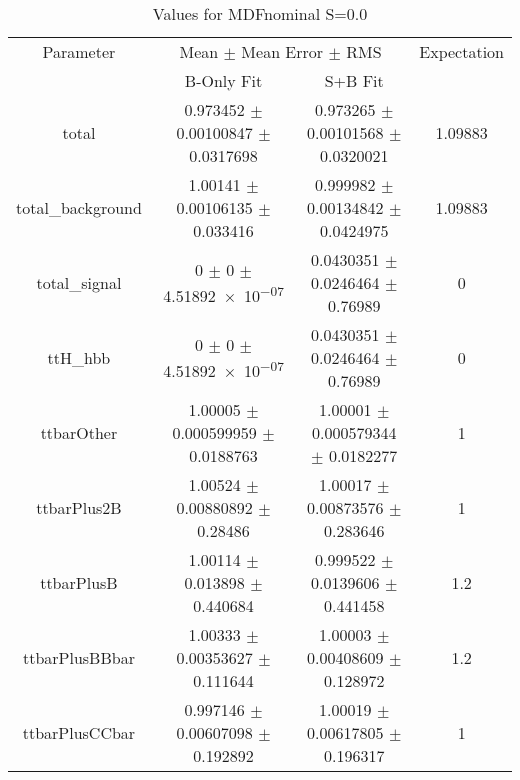 \begin{table}
\centering
\caption{Values for MDFnominal S=0.0}
\begin{tabular}{cccc}
\toprule
Parameter & \multicolumn{2}{c}{Mean $\pm$ Mean Error $\pm$ RMS} & Expectation\\
 & B-Only Fit & S+B Fit & \\
\midrule
total & \num{0.973452} $\pm$ \num{0.00100847} $\pm$ \num{0.0317698} & \num{0.973265} $\pm$ \num{0.00101568} $\pm$ \num{0.0320021} & \num{1.09883}\\
total\_background & \num{1.00141} $\pm$ \num{0.00106135} $\pm$ \num{0.033416} & \num{0.999982} $\pm$ \num{0.00134842} $\pm$ \num{0.0424975} & \num{1.09883}\\
total\_signal & \num{0} $\pm$ \num{0} $\pm$ \num{4.51892e-07} & \num{0.0430351} $\pm$ \num{0.0246464} $\pm$ \num{0.76989} & \num{0}\\
ttH\_hbb & \num{0} $\pm$ \num{0} $\pm$ \num{4.51892e-07} & \num{0.0430351} $\pm$ \num{0.0246464} $\pm$ \num{0.76989} & \num{0}\\
ttbarOther & \num{1.00005} $\pm$ \num{0.000599959} $\pm$ \num{0.0188763} & \num{1.00001} $\pm$ \num{0.000579344} $\pm$ \num{0.0182277} & \num{1}\\
ttbarPlus2B & \num{1.00524} $\pm$ \num{0.00880892} $\pm$ \num{0.28486} & \num{1.00017} $\pm$ \num{0.00873576} $\pm$ \num{0.283646} & \num{1}\\
ttbarPlusB & \num{1.00114} $\pm$ \num{0.013898} $\pm$ \num{0.440684} & \num{0.999522} $\pm$ \num{0.0139606} $\pm$ \num{0.441458} & \num{1.2}\\
ttbarPlusBBbar & \num{1.00333} $\pm$ \num{0.00353627} $\pm$ \num{0.111644} & \num{1.00003} $\pm$ \num{0.00408609} $\pm$ \num{0.128972} & \num{1.2}\\
ttbarPlusCCbar & \num{0.997146} $\pm$ \num{0.00607098} $\pm$ \num{0.192892} & \num{1.00019} $\pm$ \num{0.00617805} $\pm$ \num{0.196317} & \num{1}\\
\bottomrule
\end{tabular}
\end{table}